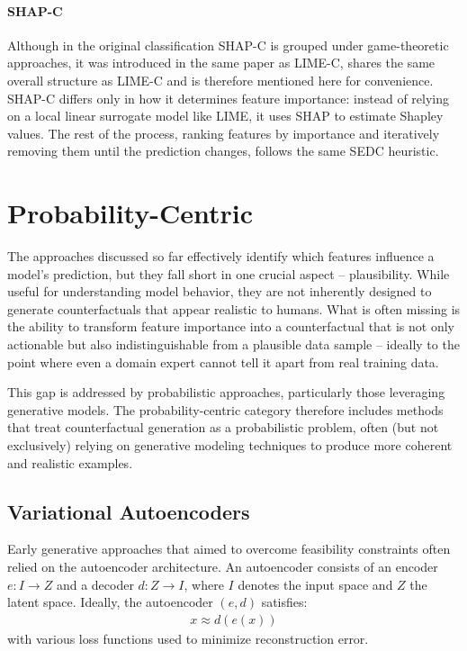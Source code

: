 \begin{methodparagraph}
    \paragraph{SHAP-C} Although in the original classification SHAP-C is grouped under game-theoretic approaches,
    it was introduced in the same paper as LIME-C, shares the same overall structure as LIME-C and is therefore mentioned here for convenience.
    SHAP-C differs only in how it determines feature importance: instead of relying on a local linear surrogate model like LIME,
    it uses SHAP \cite{lundberg2017unified} to estimate Shapley values.
    The rest of the process, ranking features by importance and iteratively removing them until the prediction changes,
    follows the same SEDC heuristic.
\end{methodparagraph}

\section{Probability-Centric}

The approaches discussed so far effectively identify which features influence a model's prediction,
but they fall short in one crucial aspect -- plausibility. While useful for understanding model behavior,
they are not inherently designed to generate counterfactuals that appear realistic to humans. What is often missing is the ability to transform feature importance into a counterfactual that is not only actionable
but also indistinguishable from a plausible data sample -- ideally to the point where even a domain expert cannot tell it apart from real training data.

This gap is addressed by probabilistic approaches, particularly those leveraging generative models.
The probability-centric category therefore includes methods that treat counterfactual generation as a probabilistic problem,
often (but not exclusively) relying on generative modeling techniques to produce more coherent and realistic examples.

\subsection{Variational Autoencoders}

Early generative approaches that aimed to overcome feasibility constraints often relied on the autoencoder architecture.
An autoencoder consists of an encoder $e : I \to Z$ and a decoder $d : Z \to I$, where $I$ denotes the input space and $Z$ the latent space. Ideally, the autoencoder $(e,d)$ satisfies:
\begin{align}
    x \approx d(e(x))
\end{align}
with various loss functions used to minimize reconstruction error.

